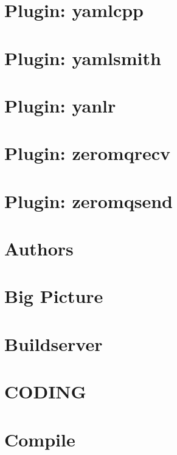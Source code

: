 \documentclass[twoside]{book}
\newcommand{\+}{\discretionary{\mbox{\scriptsize$\hookleftarrow$}}{}{}}
\begin{document}
\chapter{Plugin\+: yamlcpp}
\label{autotoc_md865}

\chapter{Plugin\+: yamlsmith}
\label{autotoc_md947}

\chapter{Plugin\+: yanlr}
\label{autotoc_md955}

\chapter{Plugin\+: zeromqrecv}
\label{autotoc_md998}

\chapter{Plugin\+: zeromqsend}
\label{autotoc_md1004}

\chapter{Authors}
\label{doc_AUTHORS_md}

\chapter{Big Picture}
\label{doc_BIGPICTURE_md}

\chapter{Buildserver}
\label{doc_BUILDSERVER_md}

\chapter{C\+O\+D\+I\+NG}
\label{doc_CODING_md}

\chapter{Compile}
\label{doc_COMPILE_md}

\end{document}
